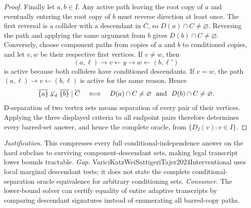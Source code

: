 \documentclass{article}
\begin{document}
\begin{proof}
Finally let \(a,b\in I\). Any active path leaving the root copy of \(a\) and eventually entering the root copy of \(b\) must reverse direction at least once. The first reversal is a collider with a descendant in \(\overline C\), so \(D(a)\cap C\ne\varnothing\). Reversing the path and applying the same argument from \(b\) gives \(D(b)\cap C\ne\varnothing\). Conversely, choose component paths from copies of \(a\) and \(b\) to conditioned copies, and let \(v,w\) be their respective first vertices. If \(v\ne w\), then
\[
 (a,\ell)\to v\leftarrow y\to w\leftarrow(b,\ell')
\]
is active because both colliders have conditioned descendants. If \(v=w\), the path \((a,\ell)\to v\leftarrow(b,\ell)\) is active for the same reason. Hence
\[
 \overline{\{a\}}\not\!\perp_d\overline{\{b\}}\mid\overline C
 \quad\Longleftrightarrow\quad
 D(a)\cap C\ne\varnothing\ \text{ and }\ D(b)\cap C\ne\varnothing.
\]
D-separation of two vertex sets means separation of every pair of their vertices. Applying the three displayed criteria to all endpoint pairs therefore determines every barred-set answer, and hence the complete oracle, from \(\{D_I(v):v\in I\}\).
\end{proof}
\par\smallskip\noindent \textit{Justification.} This compresses every full conditional-independence answer on the hard subclass to surviving component-descendant sets, making legal transcript lower bounds tractable. \textit{Gap.} VariciKatzWeiSattigeriTajer2024Interventional uses local marginal descendant tests; it does not state the complete conditional-separation oracle equivalence for arbitrary conditioning sets. \textit{Consumer.} The lower-bound solver can certify equality of entire adaptive transcripts by comparing descendant signatures instead of enumerating all barred-copy paths.
\end{document}
